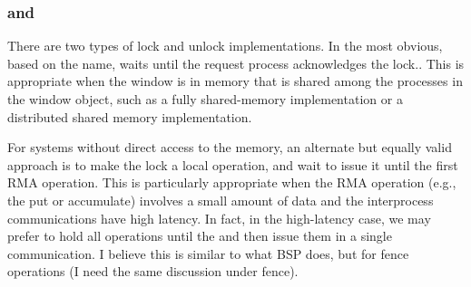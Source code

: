 \documentclass{article}
\begin{document}
\subsubsection{}
\subsubsection{}
\subsubsection{}
\subsubsection{}

\subsubsection{}

\subsubsection{}
\subsubsection{}

\subsubsection{ and }
There are two types of lock and unlock implementations.  In the most
obvious, based on the name,  waits until the
request process acknowledges the lock.. This is appropriate when the
window is in memory that is shared among the processes in the window
object, such as a fully shared-memory implementation or a distributed
shared memory implementation.

For systems without direct access to the memory, an alternate but
equally valid approach is to make the lock a local operation, and wait
to issue it until the first RMA operation.  This is particularly
appropriate when the RMA operation (e.g., the put or accumulate)
involves a small amount of data and the interprocess communications
have high latency.  In fact, in the high-latency case, we may prefer
to hold all operations until the  and then issue
them in a single communication.  I believe this is similar to what BSP
does, but for fence operations (I need the same discussion under fence).
\end{document}

